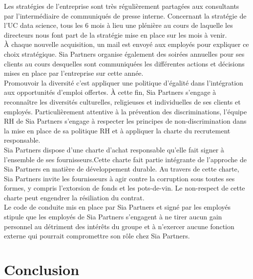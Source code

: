 \documentclass{article} %
\begin{document}
{Les stratégies de l’entreprise sont très régulièrement partagées aux consultants par l’intermédiaire de communiqués de presse interne. Concernant la stratégie de l’UC data science, tous les 6 mois à lieu une plénière au cours de laquelle les directeurs nous font part de la stratégie mise en place sur les mois à venir.\\

À chaque nouvelle acquisition, un mail est envoyé aux employés pour expliquer ce choix stratégique. Sia Partners organise également des soirées annuelles pour ses clients au cours desquelles sont communiquées les différentes actions et décisions mises en place par l’entreprise sur cette année.\\

Promouvoir la diversité c’est appliquer une politique d’égalité dans l’intégration aux opportunités d’emploi offertes. À cette fin, Sia Partners s’engage à reconnaître les diversités culturelles, religieuses et individuelles de ses clients et employés.  Particulièrement attentive à la prévention des discriminations, l’équipe RH de Sia Partners s’engage à respecter les principes de non-discrimination dans la mise en place de sa politique RH et à appliquer la charte du recrutement responsable.\\

Sia Partners dispose d’une charte d’achat responsable qu’elle fait signer à l’ensemble de ses fournisseurs.Cette charte fait partie intégrante de l’approche de Sia Partners en matière de développement durable. Au travers de cette charte, Sia Partners invite les fournisseurs à agir contre la corruption sous toutes ses formes, y compris l’extorsion de fonds et les pots-de-vin. Le non-respect de cette charte peut engendrer la résiliation du contrat.\\

Le code de conduite mis en place par Sia Partners et signé par les employés stipule que les employés de Sia Partners s’engagent à ne tirer aucun gain personnel au détriment des intérêts du groupe et à n’exercer aucune fonction externe qui pourrait compromettre son rôle chez Sia Partners.


\newpage

\section{Conclusion}


}
\end{document}
